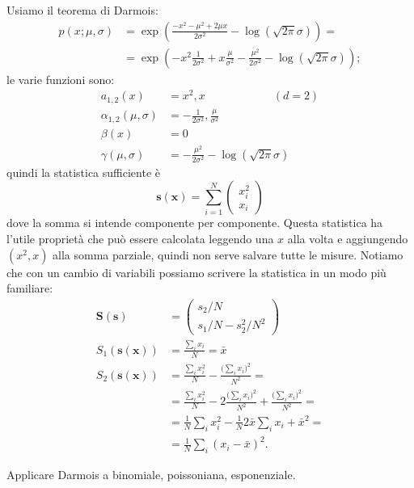 \begin{solution}
	Usiamo il teorema di Darmois:
	\begin{align*}
		p(x;\mu,\sigma)
		&= \exp \left( \frac{-x^2-\mu^2+2\mu x}{2\sigma^2} - \log(\sqrt{2\pi}\sigma) \right) = \\
		&= \exp \left( -x^2\frac1{2\sigma^2}
		+ x\frac\mu{\sigma^2}
		-\frac{\mu^2}{2\sigma^2} - \log(\sqrt{2\pi}\sigma) \right);
	\end{align*}
	le varie funzioni sono:
	\begin{align*}
		a_{1,2}(x) &= x^2, x \hspace{6em} (d=2)\\
		\alpha_{1,2}(\mu,\sigma) &= -\frac1{2\sigma^2}, \frac\mu{\sigma^2} \\
		\beta(x) &= 0 \\
		\gamma(\mu,\sigma) &= -\frac{\mu^2}{2\sigma^2} - \log(\sqrt{2\pi}\sigma)
	\end{align*}
	quindi la statistica sufficiente è
	\begin{equation*}
		\mathbf s(\mathbf x) = \sum_{i=1}^N \begin{pmatrix} x_i^2 \\ x_i \end{pmatrix}
	\end{equation*}
	dove la somma si intende componente per componente.
	Questa statistica ha l'utile proprietà che può essere calcolata leggendo una $x$ alla volta e aggiungendo $(x^2,x)$ alla somma parziale, quindi non serve salvare tutte le misure.
	Notiamo che con un cambio di variabili possiamo scrivere la statistica in un modo più familiare:
	\begin{align*}
		\mathbf S(\mathbf s)
		&= \begin{pmatrix}
			s_2 / N \\
			s_1 / N - s_2^2 / N^2
		\end{pmatrix} \\
		S_1(\mathbf s(\mathbf x)) 
		&= \frac{\sum_ix_i}N = \bar x \\
		S_2(\mathbf s(\mathbf x))
		&= \frac{\sum_ix_i^2}N - \frac{\big(\sum_ix_i\big)^2}{N^2} = \\
		&= \frac{\sum_ix_i^2}N - 2\frac{\big(\sum_ix_i\big)^2}{N^2} + \frac{\big(\sum_ix_i\big)^2}{N^2} = \\
		&= \frac1N\sum_ix_i^2 - \frac1N2\bar x\sum_ix_i + \bar x^2 = \\
		&= \frac1N\sum_i(x_i-\bar x)^2.
	\end{align*}
\end{solution}

\begin{exercise}
	Applicare Darmois a binomiale, poissoniana, esponenziale.
\end{exercise}

